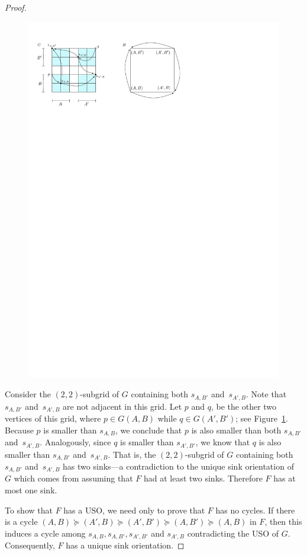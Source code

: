 \documentclass[a4paper,10pt]{article}
\newcommand{\s}[1]{\ensuremath{s_{\scriptscriptstyle#1}}}
\begin{document}
\begin{proof}
\begin{figure}[h]
\centering
\includegraphics{InducedUSO.pdf}
\caption{\small }
\label{fig:InducedUSO}
\end{figure}

Consider the $(2,2)$-subgrid of $G$ containing both $\s{A,B'}$ and~$\s{A',B}$. 
Note that $\s{A,B'}$ and~$\s{A',B}$ are not adjacent in this grid. 
Let $p$ and $q$, be the other two vertices of this grid, where $p\in G(A, B)$ while $q\in G(A', B')$; see Figure~\ref{fig:InducedUSO}.
Because $p$ is smaller than $\s{A, B}$, we conclude that $p$ is also smaller than both $\s{A,B'}$ and~$\s{A',B}$. 
Analogously, since $q$ is smaller than $\s{A',B'}$, we know that $q$ is also smaller than $\s{A,B'}$ and~$\s{A',B}$. 
That is, the $(2,2)$-subgrid of $G$ containing both $\s{A,B'}$ and~$\s{A',B}$ has two sinks---a contradiction to the unique sink orientation of $G$ which comes from assuming that $F$ had at least two sinks.
Therefore $F$ has at most one sink.

To show that $F$ has a USO, we need only to prove that $F$ has no cycles.
If there is a cycle $(A,B)\succeq (A', B) \succeq (A', B') \succeq (A, B') \succeq (A,B)$ in $F$, then
this induces a cycle among $\s{A,B}, \s{A, B'}, \s{A',B'}$ and $\s{A', B}$ contradicting the USO of $G$. Consequently, $F$ has a unique sink orientation.
\end{proof}
\end{document}
